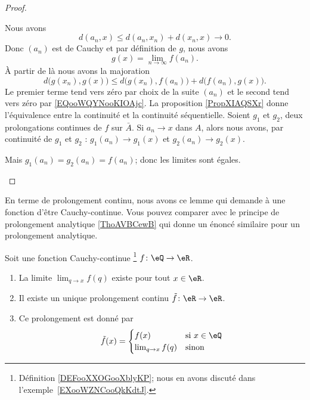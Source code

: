 \begin{proof}
\begin{subproof}
    Nous avons 
    \begin{equation}
        d(a_n,x)\leq d(a_n,x_n)+d(x_n,x)\to 0.
    \end{equation}
    Donc \( (a_n)\) est de Cauchy et par définition de \( g\), nous avons
    \begin{equation}    \label{EQooWQYNooKIOAjc}
        g(x)=\lim_{n\to \infty} f(a_n).
    \end{equation}
    À partir de là nous avons la majoration
    \begin{equation}
        d\big( g(x_n),g(x) \big)\leq d\big( g(x_n),f(a_n) \big)+d\big( f(a_n),g(x) \big).
    \end{equation}
    Le premier terme tend vers zéro par choix de la suite \( (a_n)\) et le second tend vers zéro par \eqref{EQooWQYNooKIOAjc}.
    La proposition \ref{PropXIAQSXr} donne l'équivalence entre la continuité et la continuité séquentielle.
    \spitem[Unicité]
    Soient \( g_1\) et \( g_2\), deux prolongations continues de \( f\) sur \( \bar A\). Si \( a_n\to x\) dans \( A\), alors nous avons, par continuité de \( g_1\) et \( g_2\) : \( g_1(a_n)\to g_1(x)\) et \( g_2(a_n)\to g_2(x)\).

    Mais \( g_1(a_n)=g_2(a_n)=f(a_n)\); donc les limites sont égales.
    \end{subproof}
\end{proof}

En terme de prolongement continu, nous avons ce lemme qui demande à une fonction d'être Cauchy-continue. Vous pouvez comparer avec le principe de prolongement analytique \ref{ThoAVBCewB} qui donne un énoncé similaire pour un prolongement analytique.
\begin{lemma}           \label{LEMooUAFBooAwiXxj}
	Soit une fonction Cauchy-continue \footnote{Définition \ref{DEFooXXOGooXblyKP}; nous en avons discuté dans l'exemple~\ref{EXooWZNCooQkKdtJ}.} \( f\colon \eQ\to \eR\).
	\begin{enumerate}
		\item
		      La limite \( \lim_{q\to x} f(q)\) existe pour tout \( x\in \eR\).
		\item
		      Il existe un unique prolongement continu \( \tilde f\colon \eR\to \eR\).
		\item
		      Ce prolongement est donné par
		      \begin{equation}
			      \tilde f(x)=\begin{cases}
				      f(x)               & \text{si } x\in \eQ \\
				      \lim_{q\to x} f(q) & \text{sinon }
			      \end{cases}
		      \end{equation}
	\end{enumerate}
\end{lemma}


